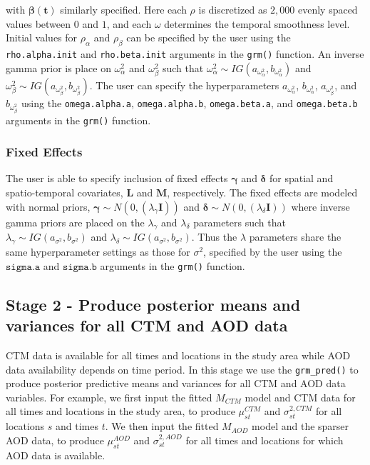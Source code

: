 \documentclass[12pt]{article}
\newcommand{\bs}{\boldsymbol}
\newcommand{\bl}{\mathbf}
\begin{document}
with $\bs{\beta}(\bl{t})$ similarly specified. 
Here each $\rho$ is discretized as $2,000$ evenly spaced values between $0$ and $1$, and each $\omega$ determines the temporal smoothness level. 
Initial values for $\rho_{\alpha}$ and $\rho_{\beta}$ can be specified by the user using the \texttt{rho.alpha.init} and \texttt{rho.beta.init} arguments in the \texttt{grm()} function.
An inverse gamma prior is place on $\omega^2_{\alpha}$ and $\omega^2_{\beta}$ such that $\omega^2_{\alpha} \sim IG(a_{\omega_{\alpha}^2}, b_{\omega_{\alpha}^2})$ and $\omega^2_{\beta} \sim IG(a_{\omega_{\beta}^2}, b_{\omega_{\beta}^2})$.
The user can specify the hyperparameters $a_{\omega_{\alpha}^2}$, $b_{\omega_{\alpha}^2}$, $a_{\omega_{\beta}^2}$, and $b_{\omega_{\beta}^2}$ using the \texttt{omega.alpha.a}, \texttt{omega.alpha.b}, \texttt{omega.beta.a}, and \texttt{omega.beta.b} arguments in the \texttt{grm()} function.

\subsubsection*{Fixed Effects}

The user is able to specify inclusion of fixed effects $\mathbf{\gamma}$ and $\mathbf{\delta}$ for spatial and spatio-temporal covariates, $\bl{L}$ and $\bl{M}$, respectively. 
The fixed effects are modeled with normal priors, $\bs{\gamma} \sim N(0, (\lambda_{\gamma}\bs{I}))$ and $\bs{\delta} \sim N(0, (\lambda_{\delta}\bs{I}))$ where inverse gamma priors are placed on the $\lambda_{\gamma}$ and $\lambda_{\delta}$ parameters such that $\lambda_{\gamma} \sim IG(a_{\sigma^2}, b_{\sigma^2})$ and $\lambda_{\delta} \sim IG(a_{\sigma^2}, b_{\sigma^2})$.
Thus the $\lambda$ parameters share the same hyperparameter settings as those for $\sigma^2$, specified by the user using the $\texttt{sigma.a}$ and $\texttt{sigma.b}$ arguments in the \texttt{grm()} function.



\subsection*{Stage 2 - Produce posterior means and variances for all CTM and AOD data}
CTM data is available for all times and locations in the study area while AOD data availability depends on time period. 
In this stage we use the \texttt{grm\_pred()} to produce posterior predictive means and variances for all CTM and AOD data variables. 
For example, we first input the fitted $M_{CTM}$ model and CTM data for all times and locations in the study area, to produce $\mu^{CTM}_{st}$ and $\sigma^{2, CTM}_{st}$ for all locations $s$ and times $t$. 
We then input the fitted $M_{AOD}$ model and the sparser AOD data, to produce $\mu^{AOD}_{st}$ and $\sigma^{2, AOD}_{st}$ for all times and locations for which AOD data is available. 
\end{document}
